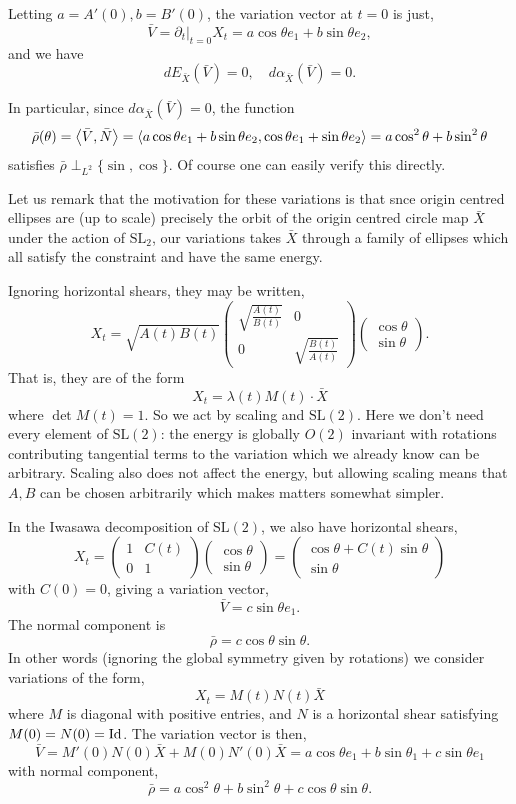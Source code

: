 \documentclass[12pt]{article}
\begin{document}
Letting \(a = A'(0), b = B'(0)\), the variation vector at \(t = 0\) is just,
\[
\bar{V} = \partial_t|_{t=0} X_t = a \cos\theta e_1 + b \sin\theta e_2,
\]
and we have
\[
dE_{\bar{X}} (\bar{V}) = 0, \quad d\alpha_{\bar{X}} (\bar{V}) = 0.
\]

In particular, since \(d\alpha_{\bar{X}} (\bar{V}) = 0\), the function
\[
\bar{\rho} (\theta) = \left\langle{\bar{V}},{\bar{N}}\right\rangle = \left\langle{a \cos\theta e_1 + b \sin\theta e_2},{\cos\theta e_1 + \sin\theta e_2}\right\rangle = a \cos^2\theta + b \sin^2\theta
\]
satisfies \(\bar{\rho} \perp_{L^2} \{\sin, \cos\}\). Of course one can easily verify this directly.

Let us remark that the motivation for these variations is that snce origin centred ellipses are (up to scale) precisely the orbit of the origin centred circle map \(\bar{X}\) under the action of \(\text{SL}_2\), our variations takes \(\bar{X}\) through a family of ellipses which all satisfy the constraint and have the same energy.

Ignoring horizontal shears, they may be written,
\[
X_t = \sqrt{A(t) B(t)}
\begin{pmatrix}
\sqrt{\frac{A(t)}{B(t)}} & 0 \\
0 & \sqrt{\frac{B(t)}{A(t)}}
\end{pmatrix}
\begin{pmatrix}
\cos \theta \\
\sin \theta
\end{pmatrix}.
\]
That is, they are of the form
\[
X_t = \lambda(t) M(t) \cdot \bar{X}
\]
where \(\det M(t) = 1\). So we act by scaling and \(\text{SL}(2)\). Here we don't need every element of \(\text{SL}(2)\): the energy is globally \(O(2)\) invariant with rotations contributing tangential terms to the variation which we already know can be arbitrary. Scaling also does not affect the energy, but allowing scaling means that \(A, B\) can be chosen arbitrarily which makes matters somewhat simpler.

In the Iwasawa decomposition of \(\text{SL}(2)\), we also have horizontal shears,
\[
X_t = 
\begin{pmatrix}
1 & C(t) \\
0 & 1
\end{pmatrix}
\begin{pmatrix}
\cos \theta \\
\sin \theta
\end{pmatrix}
=
\begin{pmatrix}
\cos\theta + C(t) \sin\theta \\
\sin\theta
\end{pmatrix}
\]
with \(C(0) = 0\), giving a variation vector,
\[
\bar{V} = c \sin\theta e_1.
\]
The normal component is
\[
\bar{\rho} = c \cos\theta \sin\theta.
\]
In other words (ignoring the global symmetry given by rotations) we consider variations of the form,
\[
X_t = M(t) N(t) \bar{X}
\]
where \(M\) is diagonal with positive entries, and \(N\) is a horizontal shear satisfying \(M(0) = N(0) = \operatorname{Id}\). The variation vector is then,
\[
\bar{V} = M'(0) N(0) \bar{X} + M(0) N'(0) \bar{X} = a \cos\theta e_1 + b \sin\theta_1 + c \sin\theta e_1
\]
with normal component,
\[
\bar{\rho} = a \cos^2\theta + b \sin^2 \theta + c \cos\theta \sin\theta.
\]
\end{document}

